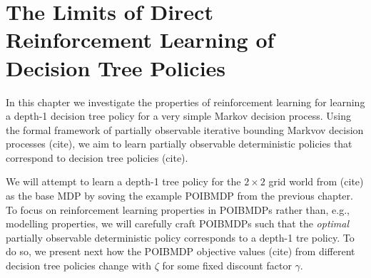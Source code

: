 \chapter{The Limits of Direct Reinforcement Learning of Decision Tree Policies}
In this chapter we investigate the properties of reinforcement learning for learning a depth-1 decision tree policy for a very simple Markov decision process.
Using the formal framework of partially observable iterative bounding Markvov decision processes (cite), we aim to learn partially observable deterministic policies that correspond to decision tree policies (cite).

We will attempt to learn a depth-1 tree policy for the $2\times 2$ grid world from (cite) as the base MDP by soving the example POIBMDP from the previous chapter.
To focus on reinforcement learning properties in POIBMDPs rather than, e.g., modelling properties, we will carefully craft POIBMDPs such that the \textit{optimal} partially observable deterministic policy corresponds to a depth-1 tre policy.
To do so, we present next how the POIBMDP objective values (cite) from different decision tree policies change with $\zeta$ for some fixed discount factor $\gamma$.  


